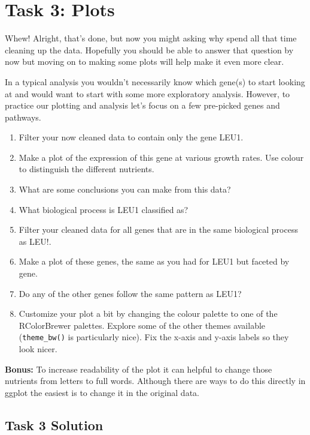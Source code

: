 \documentclass[
]{book}
\providecommand{\tightlist}{%
  \setlength{\itemsep}{0pt}\setlength{\parskip}{0pt}}
\begin{document}
\hypertarget{task-3-plots}{%
\section*{Task 3: Plots}\label{task-3-plots}}

Whew! Alright, that's done, but now you might asking why spend all that time cleaning up the data. Hopefully you should be able to answer that question by now but moving on to making some plots will help make it even more clear.

In a typical analysis you wouldn't necessarily know which gene(s) to start looking at and would want to start with some more exploratory analysis. However, to practice our plotting and analysis let's focus on a few pre-picked genes and pathways.

\begin{enumerate}
\def\labelenumi{\arabic{enumi}.}
\tightlist
\item
  Filter your now cleaned data to contain only the gene LEU1.
\item
  Make a plot of the expression of this gene at various growth rates. Use colour to distinguish the different nutrients.
\item
  What are some conclusions you can make from this data?
\item
  What biological process is LEU1 classified as?
\item
  Filter your cleaned data for all genes that are in the same biological process as LEU!.
\item
  Make a plot of these genes, the same as you had for LEU1 but faceted by gene.
\item
  Do any of the other genes follow the same pattern as LEU1?\\
\item
  Customize your plot a bit by changing the colour palette to one of the RColorBrewer palettes. Explore some of the other themes available (\texttt{theme\_bw()} is particularly nice). Fix the x-axis and y-axis labels so they look nicer.
\end{enumerate}

\textbf{Bonus:} To increase readability of the plot it can helpful to change those nutrients from letters to full words. Although there are ways to do this directly in ggplot the easiest is to change it in the original data.

\hypertarget{task-3-solution}{%
\subsection*{Task 3 Solution}\label{task-3-solution}}
\end{document}
